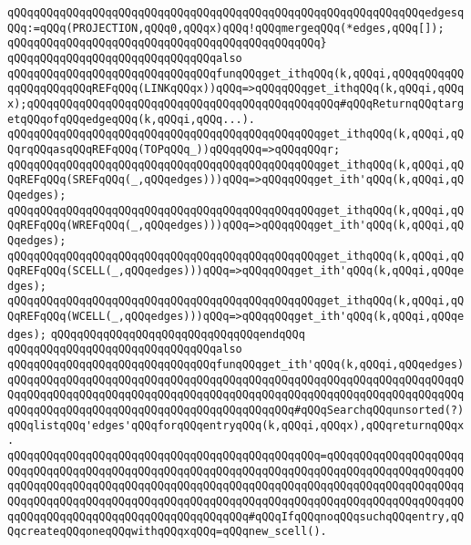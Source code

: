 \newline
\verb|qQQqqQQqqQQqqQQqqQQqqQQqqQQqqQQqqQQqqQQqqQQqqQQqqQQqqQQqqQQqqQQqedgesqQQq:=qQQq(PROJECTION,qQQq0,qQQqx)qQQq!qQQqmergeqQQq(*edges,qQQq[]);|\newline
\verb|qQQqqQQqqQQqqQQqqQQqqQQqqQQqqQQqqQQqqQQqqQQqqQQq}|\newline
\newline
\verb|qQQqqQQqqQQqqQQqqQQqqQQqqQQqqQQqalso|\newline
\verb|qQQqqQQqqQQqqQQqqQQqqQQqqQQqqQQqfunqQQqget_ithqQQq(k,qQQqi,qQQqqQQqqQQqqQQqqQQqqQQqREFqQQq(LINKqQQqx))qQQq=>qQQqqQQqget_ithqQQq(k,qQQqi,qQQqx);qQQqqQQqqQQqqQQqqQQqqQQqqQQqqQQqqQQqqQQqqQQqqQQq#qQQqReturnqQQqtargetqQQqofqQQqedgeqQQq(k,qQQqi,qQQq...).|\newline
\verb|qQQqqQQqqQQqqQQqqQQqqQQqqQQqqQQqqQQqqQQqqQQqqQQqget_ithqQQq(k,qQQqi,qQQqrqQQqasqQQqREFqQQq(TOPqQQq_))qQQqqQQq=>qQQqqQQqr;|\newline
\newline
\verb|qQQqqQQqqQQqqQQqqQQqqQQqqQQqqQQqqQQqqQQqqQQqqQQqget_ithqQQq(k,qQQqi,qQQqREFqQQq(SREFqQQq(_,qQQqedges)))qQQq=>qQQqqQQqget_ith'qQQq(k,qQQqi,qQQqedges);|\newline
\verb|qQQqqQQqqQQqqQQqqQQqqQQqqQQqqQQqqQQqqQQqqQQqqQQqget_ithqQQq(k,qQQqi,qQQqREFqQQq(WREFqQQq(_,qQQqedges)))qQQq=>qQQqqQQqget_ith'qQQq(k,qQQqi,qQQqedges);|\newline
\verb|qQQqqQQqqQQqqQQqqQQqqQQqqQQqqQQqqQQqqQQqqQQqqQQqget_ithqQQq(k,qQQqi,qQQqREFqQQq(SCELL(_,qQQqedges)))qQQq=>qQQqqQQqget_ith'qQQq(k,qQQqi,qQQqedges);|\newline
\verb|qQQqqQQqqQQqqQQqqQQqqQQqqQQqqQQqqQQqqQQqqQQqqQQqget_ithqQQq(k,qQQqi,qQQqREFqQQq(WCELL(_,qQQqedges)))qQQq=>qQQqqQQqget_ith'qQQq(k,qQQqi,qQQqedges);|\newline
\verb|qQQqqQQqqQQqqQQqqQQqqQQqqQQqqQQqendqQQq|\newline
\newline
\verb|qQQqqQQqqQQqqQQqqQQqqQQqqQQqqQQqalso|\newline
\verb|qQQqqQQqqQQqqQQqqQQqqQQqqQQqqQQqfunqQQqget_ith'qQQq(k,qQQqi,qQQqedges)qQQqqQQqqQQqqQQqqQQqqQQqqQQqqQQqqQQqqQQqqQQqqQQqqQQqqQQqqQQqqQQqqQQqqQQqqQQqqQQqqQQqqQQqqQQqqQQqqQQqqQQqqQQqqQQqqQQqqQQqqQQqqQQqqQQqqQQqqQQqqQQqqQQqqQQqqQQqqQQqqQQqqQQqqQQqqQQqqQQqqQQq#qQQqSearchqQQqunsorted(?)qQQqlistqQQq'edges'qQQqforqQQqentryqQQq(k,qQQqi,qQQqx),qQQqreturnqQQqx.|\newline
\verb|qQQqqQQqqQQqqQQqqQQqqQQqqQQqqQQqqQQqqQQqqQQqqQQq=qQQqqQQqqQQqqQQqqQQqqQQqqQQqqQQqqQQqqQQqqQQqqQQqqQQqqQQqqQQqqQQqqQQqqQQqqQQqqQQqqQQqqQQqqQQqqQQqqQQqqQQqqQQqqQQqqQQqqQQqqQQqqQQqqQQqqQQqqQQqqQQqqQQqqQQqqQQqqQQqqQQqqQQqqQQqqQQqqQQqqQQqqQQqqQQqqQQqqQQqqQQqqQQqqQQqqQQqqQQqqQQqqQQqqQQqqQQqqQQqqQQqqQQqqQQqqQQqqQQqqQQqqQQq#qQQqIfqQQqnoqQQqsuchqQQqentry,qQQqcreateqQQqoneqQQqwithqQQqxqQQq=qQQqnew_scell().|\newline
